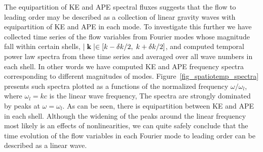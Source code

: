 The equipartition of KE and APE spectral fluxes suggests that the flow to leading order may be described as a collection of linear gravity waves with equipartition of KE and APE in each mode. To investigate this further we have collected time series of the flow variables from Fourier modes whose magnitude fall within certain shells,  $ \mid {\bf k} \mid \in [ k -\delta k/2, \; k+ \delta k/2] $,  and computed temporal power law spectra from these time series and averaged over all wave numbers in each shell.  In other words we have computed KE and APE frequency spectra corresponding to different magnitudes of modes. 
Figure~\ref{fig_spatiotemp_spectra} presents such
spectra plotted as a functions of the normalized frequency
$\omega/\omega_l$, where $ \omega_l = kc $ is the linear wave frequency, 
The spectra are strongly dominated by  peaks at $\omega =
\omega_l$. As can be seen, there is equipartition between KE and APE in each shell.  
Although the widening of the peaks around the linear frequency most likely is an effects of nonlinearities, 
we can quite safely conclude that the time evolution of the flow variables in each Fourier mode to leading order can be described as a linear wave.

